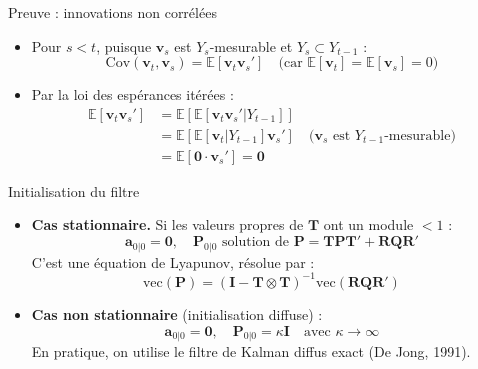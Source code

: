 \documentclass[11pt,aspectratio=169]{beamer}
\newcommand{\E}{\mathbb{E}}
\newcommand{\Cov}{\mathrm{Cov}}
\begin{document}
\begin{frame}{Preuve : innovations non corrélées}

\begin{itemize}

\item Pour $s < t$, puisque $\bm{v}_s$ est $Y_s$-mesurable et $Y_s \subset Y_{t-1}$ :
  \[
  \Cov(\bm{v}_t, \bm{v}_s) = \E[\bm{v}_t \bm{v}_s'] \quad \text{(car $\E[\bm{v}_t] = \E[\bm{v}_s] = 0$)}
  \]\newline

\item Par la loi des espérances itérées :
  \begin{align*}
  \E[\bm{v}_t \bm{v}_s'] &= \E\!\left[\E[\bm{v}_t \bm{v}_s' | Y_{t-1}]\right] \\
  &= \E\!\left[\E[\bm{v}_t | Y_{t-1}] \bm{v}_s'\right] \quad \text{($\bm{v}_s$ est $Y_{t-1}$-mesurable)} \\
  &= \E[\bm{0} \cdot \bm{v}_s'] = \bm{0}
  \end{align*}

\end{itemize}

\end{frame}

\begin{frame}{Initialisation du filtre}

\begin{itemize}

\item \textbf{Cas stationnaire.} Si les valeurs propres de $\bm{T}$ ont un module $< 1$ :
  \[
  \bm{a}_{0|0} = \bm{0}, \quad \bm{P}_{0|0} \text{ solution de } \bm{P} = \bm{T} \bm{P} \bm{T}' + \bm{R} \bm{Q} \bm{R}'
  \]
  C'est une équation de Lyapunov, résolue par :
  \[
  \mathrm{vec}(\bm{P}) = (\bm{I} - \bm{T} \otimes \bm{T})^{-1} \mathrm{vec}(\bm{R} \bm{Q} \bm{R}')
  \]\newline

\item \textbf{Cas non stationnaire} (initialisation diffuse) :
  \[
  \bm{a}_{0|0} = \bm{0}, \quad \bm{P}_{0|0} = \kappa \bm{I} \quad \text{avec } \kappa \to \infty
  \]
  En pratique, on utilise le filtre de Kalman diffus exact (De Jong, 1991).

\end{itemize}

\end{frame}

\end{document}
